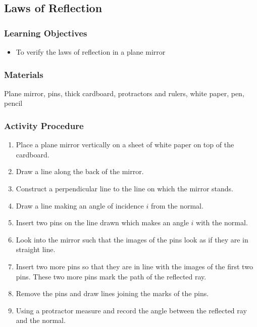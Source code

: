 	
	
	


\subsection{Laws of Reflection}

\subsubsection*{Learning Objectives}
\begin{itemize}
\item{To verify the laws of reflection in a plane mirror}
\end{itemize}

\subsubsection*{Materials}
Plane mirror, pins, thick cardboard, protractors and rulers, white paper, pen, pencil

\subsubsection{Activity Procedure}
\begin{enumerate}
\item{Place a plane mirror vertically on a sheet of white paper on top of the cardboard.}
\item{Draw a line along the back of the mirror.}
\item{Construct a perpendicular line to the line on which the mirror stands.}  
\item{Draw a line making an angle of incidence $i$ from the normal.}
\item{Insert two pins on the line drawn which makes an angle $i$ with the normal.}
\item{Look into the mirror such that the images of the pins look as if they are in straight line.}
\item{Insert two more pins so that they are in line with the images of the first two pins.  These two more pins mark the path of the reflected ray.}
\item{Remove the pins and draw lines joining the marks of the pins.}
\item{Using a protractor measure and record the angle between the reflected ray and the normal.}
\end{enumerate}

